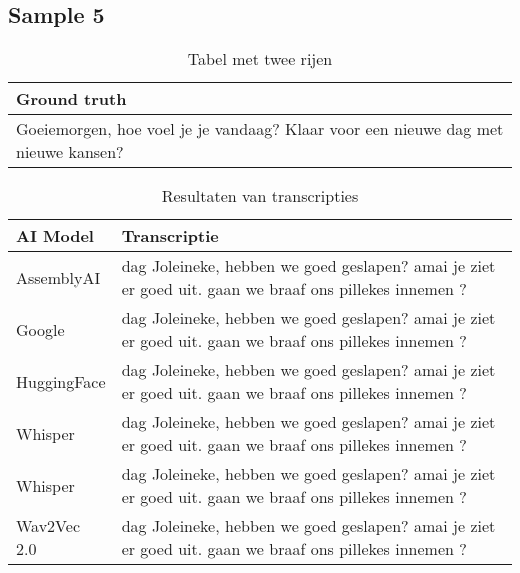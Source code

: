 \subsection{Sample 5}
\begin{table}[htbp]
    \centering
    \label{tab:groundtruth_sample5}
    \begin{tabularx}{\textwidth}{|X|}
        \hline
        \textbf{Ground truth} \\
        
        \hline
        Goeiemorgen, hoe voel je je vandaag? Klaar voor een nieuwe dag met nieuwe kansen? \\
        \hline
    \end{tabularx}
    \caption{Tabel met twee rijen}
\end{table}

\begin{table}[htbp]
    \centering
    \label{tab:results_sample5}
    \begin{tabularx}{\textwidth}{|l|X|}
        \hline
        \textbf{AI Model} & \textbf{Transcriptie} \\ \midrule
        
        AssemblyAI & dag Joleineke, hebben we goed geslapen? amai je ziet er goed uit. gaan we braaf ons pillekes innemen ? \\ \hline
        
        Google & dag Joleineke, hebben we goed geslapen? amai je ziet er goed uit. gaan we braaf ons pillekes innemen ? \\ \hline
        
        HuggingFace & dag Joleineke, hebben we goed geslapen? amai je ziet er goed uit. gaan we braaf ons pillekes innemen ? \\ \hline
        
        Whisper & dag Joleineke, hebben we goed geslapen? amai je ziet er goed uit. gaan we braaf ons pillekes innemen ? \\ \hline
        
        Whisper & dag Joleineke, hebben we goed geslapen? amai je ziet er goed uit. gaan we braaf ons pillekes innemen ? \\ \hline
        
        Wav2Vec 2.0 & dag Joleineke, hebben we goed geslapen? amai je ziet er goed uit. gaan we braaf ons pillekes innemen ? \\ \hline
    \end{tabularx}
    \caption{Resultaten van transcripties}
\end{table}
\FloatBarrier

